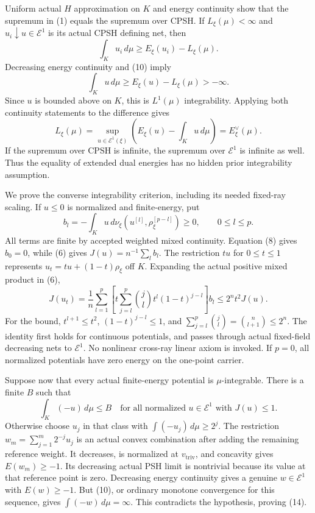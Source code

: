 \documentclass[
  10pt,
]{article}
\begin{document}
Uniform actual \(H\) approximation on \(K\) and energy continuity show
that the supremum in (1) equals the supremum over CPSH. If
\(L_\xi(\mu)<\infty\) and \(u_i\downarrow u\in\mathcal E^1\) is its
actual CPSH defining net, then \[
             \int_Ku_i\,d\mu\geq E_\xi(u_i)-L_\xi(\mu).
\] Decreasing energy continuity and (10) imply \[
          \int_Ku\,d\mu\geq E_\xi(u)-L_\xi(\mu)>-\infty.               \tag{11}
\] Since \(u\) is bounded above on \(K\), this is \(L^1(\mu)\)
integrability. Applying both continuity statements to the difference
gives \[
 L_\xi(\mu)=\sup_{u\in\mathcal E^1(\xi)}
                  \left(E_\xi(u)-\int_Ku\,d\mu\right)
             =E_\xi^\vee(\mu).                                      \tag{12}
\] If the supremum over CPSH is infinite, the supremum over
\(\mathcal E^1\) is infinite as well. Thus the equality of extended dual
energies has no hidden prior integrability assumption.

We prove the converse integrability criterion, including its needed
fixed-ray scaling. If \(u\leq0\) is normalized and finite-energy, put \[
 b_l=-\int_K u\,d\nu_\xi(u^{[l]},\rho_\xi^{[p-l]})\geq0,
               \qquad 0\leq l\leq p.
\] All terms are finite by accepted weighted mixed continuity. Equation
(8) gives \(b_0=0\), while (6) gives \(J(u)=n^{-1}\sum_lb_l\). The
restriction \(tu\) for \(0\leq t\leq1\) represents
\(u_t=tu+(1-t)\rho_\xi\) off \(K\). Expanding the actual positive mixed
product in (6), \[
 J(u_t)=\frac1n\sum_{l=1}^p
   \left[t\sum_{j=l}^p{j\choose l}t^l(1-t)^{j-l}\right]b_l
       \leq 2^n t^2J(u).                                             \tag{13}
\] For the bound, \(t^{l+1}\leq t^2\), \((1-t)^{j-l}\leq1\), and
\(\sum_{j=l}^p{j\choose l}={n\choose l+1}\leq2^n\). The identity first
holds for continuous potentials, and passes through actual fixed-field
decreasing nets to \(\mathcal E^1\). No nonlinear cross-ray linear axiom
is invoked. If \(p=0\), all normalized potentials have zero energy on
the one-point carrier.

Suppose now that every actual finite-energy potential is
\(\mu\)-integrable. There is a finite \(B\) such that \[
 \int_K(-u)\,d\mu\leq B
 \quad\text{for all normalized }u\in\mathcal E^1\text{ with }J(u)\leq1.                       \tag{14}
\] Otherwise choose \(u_j\) in that class with
\(\int(-u_j)\,d\mu\geq2^j\). The restriction
\(w_m=\sum_{j=1}^m2^{-j}u_j\) is an actual convex combination after
adding the remaining reference weight. It decreases, is normalized at
\(v_{\mathrm{triv}}\), and concavity gives \(E(w_m)\geq-1\). Its
decreasing actual PSH limit is nontrivial because its value at that
reference point is zero. Decreasing energy continuity gives a genuine
\(w\in\mathcal E^1\) with \(E(w)\geq-1\). But (10), or ordinary monotone
convergence for this sequence, gives \(\int(-w)\,d\mu=\infty\). This
contradicts the hypothesis, proving (14).
\end{document}
